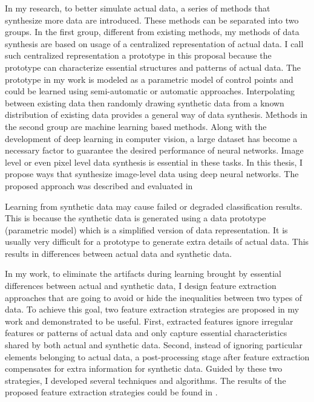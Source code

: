 \documentclass{iitthesis}
\begin{document}
In my research, to better simulate actual data, a series of methods that synthesize more data are introduced. These methods can be separated into two groups. In the first group, different from existing methods, my methods of data synthesis are based on usage of a centralized representation of actual data. I call such centralized representation a prototype in this proposal because the prototype can characterize essential structures and patterns of actual data. The prototype in my work is modeled as a parametric model of control points and could be learned using semi-automatic or automatic approaches. Interpolating between existing data then randomly drawing synthetic data from a known distribution of existing data provides a general way of data synthesis. Methods in the second group are machine learning based methods. Along with the development of deep learning in computer vision, a large dataset has become a necessary factor to guarantee the desired performance of neural networks. Image level or even pixel level data synthesis is essential in these tasks. In this thesis, I propose ways that synthesize image-level data using deep neural networks. The proposed approach was described and evaluated in \cite{Zhang2014Autoencoder}\cite{AndiZang2015}\cite{ZX:14}\cite{Ouyang:17}\cite{ZX17:OpticalFlow}

 Learning from synthetic data may cause failed or degraded classification results. This is because the synthetic data is generated using a data prototype (parametric model) which is a simplified version of data representation. It is usually very difficult for a prototype to generate extra details of actual data. This results in differences between actual data and synthetic data.

In my work, to eliminate the artifacts during learning brought by essential differences between actual and synthetic data, I design feature extraction approaches that are going to avoid or hide the inequalities between two types of data. To achieve this goal, two feature extraction strategies are proposed in my work and demonstrated to be useful. First, extracted features ignore irregular features or patterns of actual data and only capture essential characteristics shared by both actual and synthetic data. Second, instead of ignoring particular elements belonging to actual data, a post-processing stage after feature extraction compensates for extra information for synthetic data. Guided by these two strategies, I developed several techniques and algorithms. The results of the proposed feature extraction strategies could be found in \cite{Zhang2014Autoencoder}\cite{AndiZang2015}\cite{ZX:14}\cite{ZX:14b}.
\end{document}
